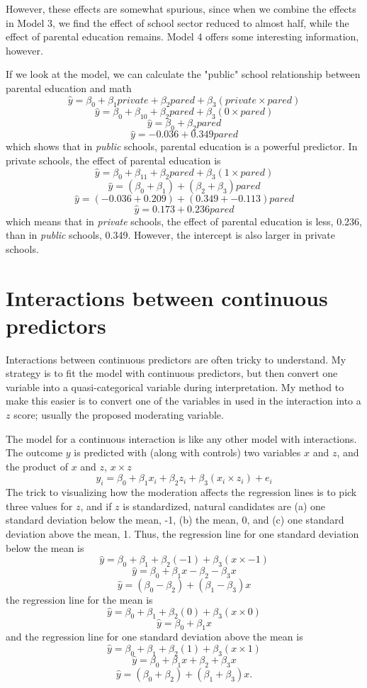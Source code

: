 However, these effects are somewhat spurious, since when we combine the effects in Model 3, we find the effect of school sector reduced to almost half, while the effect of parental education remains. Model 4 offers some interesting information, however.

If we look at the model, we can calculate the "public" school relationship between parental education and math
\[
\hat{y} = \beta_0+\beta_1private+\beta_2pared+\beta_3\left(private \times pared\right)
\]
\[
\hat{y} = \beta_0+\beta_10+\beta_2pared+\beta_3\left(0 \times pared\right)
\]
\[
\hat{y} = \beta_0+\beta_2pared
\]
\[
\hat{y} = -0.036+0.349pared
\]
which shows that in {\it public} schools, parental education is a powerful predictor. In private schools, the effect of parental education is
\[
\hat{y} = \beta_0+\beta_11+\beta_2pared+\beta_3\left(1 \times pared\right)
\]
\[
\hat{y} = \left(\beta_0+\beta_1\right)+\left(\beta_2+\beta_3\right)pared
\]
\[
\hat{y} = \left(-0.036+0.209\right)+\left(0.349+-0.113\right)pared
\]
\[
\hat{y} = 0.173+0.236pared
\]
which means that in {\it private} schools, the effect of parental education is less, 0.236, than in {\it public} schools, 0.349. However, the intercept is also larger in private schools.

\section{Interactions between continuous predictors}

Interactions between continuous predictors are often tricky to understand. My strategy is to fit the model with continuous predictors, but then convert one variable into a quasi-categorical variable during interpretation. My method to make this easier is to convert one of the variables in used in the interaction into a $z$ score; usually the proposed moderating variable.

The model for a continuous interaction is like any other model with interactions. The outcome $y$ is predicted with (along with controls) two variables $x$ and $z$, and the product of $x$ and $z$, $x\times z$
\[
y_i=\beta_0+\beta_1x_i+\beta_2z_i+\beta_3\left(x_i\times z_i\right)+e_i
\]
The trick to visualizing how the moderation affects the regression lines is to pick three values for $z$, and if $z$ is standardized, natural candidates are (a) one standard deviation below the mean, -1, (b) the mean, 0, and (c) one standard deviation above the mean, 1. Thus, the regression line for one standard deviation below the mean is
\[
\hat{y}=\beta_0+\beta_1+\beta_2\left(-1\right)+\beta_3\left(x\times -1\right)
\]
\[
\hat{y}=\beta_0+\beta_1x-\beta_2-\beta_3x
\]
\[
\hat{y}=\left(\beta_0-\beta_2\right)+\left(\beta_1-\beta_3\right)x
\]
the regression line for the mean is
\[
\hat{y}=\beta_0+\beta_1+\beta_2\left(0\right)+\beta_3\left(x\times 0\right)
\]
\[
\hat{y}=\beta_0+\beta_1x
\]
and the regression line for one standard deviation above the mean is
\[
\hat{y}=\beta_0+\beta_1+\beta_2\left(1\right)+\beta_3\left(x\times 1\right)
\]
\[
\hat{y}=\beta_0+\beta_1x+\beta_2+\beta_3x
\]
\[
\hat{y}=\left(\beta_0+\beta_2\right)+\left(\beta_1+\beta_3\right)x.
\]

